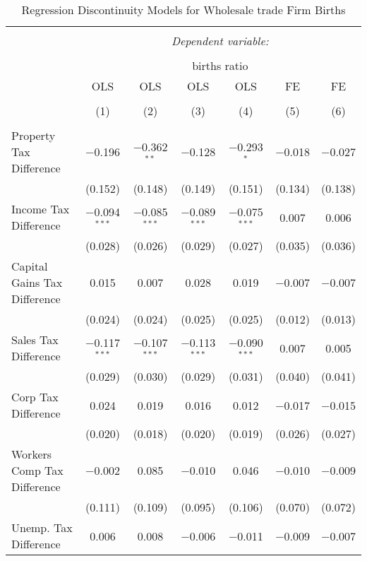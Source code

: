 
\begin{table}[!htbp] \centering 
  \caption{Regression Discontinuity Models for  Wholesale trade Firm Births} 
  \label{42rd} 
\begin{tabular}{@{\extracolsep{5pt}}lcccccc} 
\\[-1.8ex]\hline 
\hline \\[-1.8ex] 
 & \multicolumn{6}{c}{\textit{Dependent variable:}} \\ 
\cline{2-7} 
\\[-1.8ex] & \multicolumn{6}{c}{births ratio} \\ 
 & OLS & OLS & OLS & OLS & FE & FE \\ 
\\[-1.8ex] & (1) & (2) & (3) & (4) & (5) & (6)\\ 
\hline \\[-1.8ex] 
 Property Tax Difference & $-$0.196 & $-$0.362$^{**}$ & $-$0.128 & $-$0.293$^{*}$ & $-$0.018 & $-$0.027 \\ 
  & (0.152) & (0.148) & (0.149) & (0.151) & (0.134) & (0.138) \\ 
  Income Tax Difference & $-$0.094$^{***}$ & $-$0.085$^{***}$ & $-$0.089$^{***}$ & $-$0.075$^{***}$ & 0.007 & 0.006 \\ 
  & (0.028) & (0.026) & (0.029) & (0.027) & (0.035) & (0.036) \\ 
  Capital Gains Tax Difference & 0.015 & 0.007 & 0.028 & 0.019 & $-$0.007 & $-$0.007 \\ 
  & (0.024) & (0.024) & (0.025) & (0.025) & (0.012) & (0.013) \\ 
  Sales Tax Difference & $-$0.117$^{***}$ & $-$0.107$^{***}$ & $-$0.113$^{***}$ & $-$0.090$^{***}$ & 0.007 & 0.005 \\ 
  & (0.029) & (0.030) & (0.029) & (0.031) & (0.040) & (0.041) \\ 
  Corp Tax Difference & 0.024 & 0.019 & 0.016 & 0.012 & $-$0.017 & $-$0.015 \\ 
  & (0.020) & (0.018) & (0.020) & (0.019) & (0.026) & (0.027) \\ 
  Workers Comp Tax Difference & $-$0.002 & 0.085 & $-$0.010 & 0.046 & $-$0.010 & $-$0.009 \\ 
  & (0.111) & (0.109) & (0.095) & (0.106) & (0.070) & (0.072) \\ 
  Unemp. Tax Difference & 0.006 & 0.008 & $-$0.006 & $-$0.011 & $-$0.009 & $-$0.007 \\ 

\end{tabular}
\end{table}
